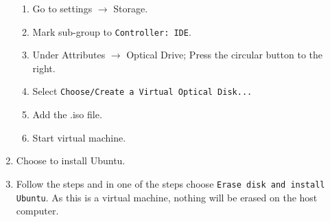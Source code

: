 \begin{enumerate}
\begin{enumerate}
            \item Go to settings \(\rightarrow\) Storage.
            \item Mark sub-group to \texttt{Controller: IDE}.
            \item Under Attributes \(\rightarrow\) Optical Drive; Press the circular button to the right.
            \item Select \texttt{Choose/Create a Virtual Optical Disk...}
            \item Add the .iso file.
            \item Start virtual machine.
        \end{enumerate}
    \item Choose to install Ubuntu.
    \item Follow the steps and in one of the steps choose \texttt{Erase disk and install Ubuntu}. As this is a virtual machine, nothing will be erased on the host computer.
\end{enumerate}

\newpage


\newpage
